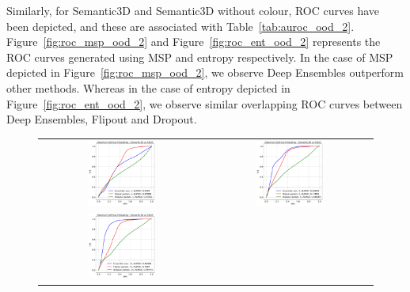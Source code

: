     Similarly, for Semantic3D and Semantic3D without colour, ROC curves have been depicted, and these are associated with Table~\ref{tab:auroc_ood_2}.
    Figure~\ref{fig:roc_msp_ood_2} and Figure~\ref{fig:roc_ent_ood_2} represents the ROC curves generated using MSP and entropy respectively.
    In the case of MSP depicted in Figure~\ref{fig:roc_msp_ood_2}, we observe Deep Ensembles outperform other methods.
    Whereas in the case of entropy depicted in Figure~\ref{fig:roc_ent_ood_2}, we observe similar overlapping ROC curves between Deep Ensembles, Flipout and Dropout.
    \begin{figure}
        \centering
        \begin{tabular}{cc}
            \includegraphics[width = 0.42\textwidth, height= 0.3\textheight]{images/AUROC/MSP_1.pdf} & 
            \includegraphics[width = 0.42\textwidth, height= 0.3\textheight]{images/AUROC/MSP_5.pdf}\\ 
            \includegraphics[width = 0.42\textwidth, height= 0.3\textheight]{images/AUROC/MSP_15.pdf} & 

\end{tabular}
\end{figure}
